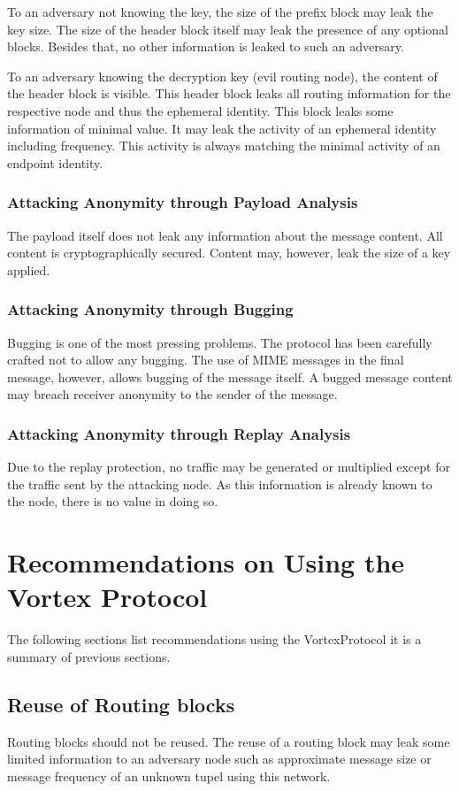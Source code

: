 To an adversary not knowing the key, the size of the prefix block may leak the key size. The size of the header block itself may leak the presence of any optional blocks. Besides that, no other information is leaked to such an adversary.

To an adversary knowing the decryption key (evil routing node), the content of the header block is visible. This header block leaks all routing information for the respective node and thus the ephemeral identity. This block leaks some information of minimal value. It may leak the activity of an ephemeral identity including frequency. This activity is always matching the minimal activity of an endpoint identity. 

\subsection{Attacking Anonymity through Payload Analysis}
The payload itself does not leak any information about the message content. All content is cryptographically secured. Content may, however, leak the size of a key applied.

\subsection{Attacking Anonymity through Bugging}
Bugging is one of the most pressing problems. The protocol has been carefully crafted not to allow any bugging. The use of MIME messages in the final message, however, allows bugging of the message itself. A bugged message content may breach receiver anonymity to the sender of the message.

\subsection{Attacking Anonymity through Replay Analysis}
Due to the replay protection, no traffic may be generated or multiplied except for the traffic sent by the attacking node. As this information is already known to the node, there is no value in doing so. 

\chapter{Recommendations on Using the Vortex Protocol}
The following sections list recommendations using the VortexProtocol it is a summary of previous sections.

\section{Reuse of Routing blocks\label{sec:reuseRB}}
Routing blocks should not be reused. The reuse of a routing block may leak some limited information to an adversary node such as approximate message size or message frequency of an unknown tupel using this network.

